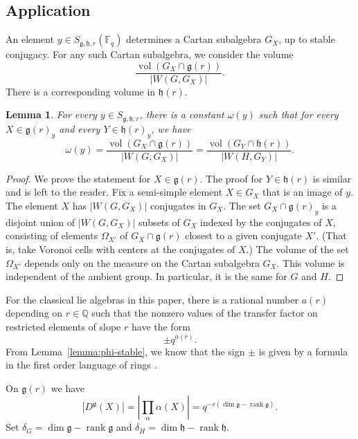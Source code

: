 \documentclass[11pt]{amsart}
\newtheorem{lemma}[theorem]{Lemma}
\theoremstyle{definition}
\theoremstyle{remark}
\numberwithin{equation}{theorem}
\def\f{{\mathbb{F}_q}}
\def\gF{{\mathfrak{g}}}
\def\vol{{\operatorname{vol}}}
\newcommand{\ring}[1]{\mathbb{#1}}
\def\lie#1{{\mathfrak{#1}}}
\def\vol{\operatorname{vol}}
\def\rank{\operatorname{rank}}
\begin{document}
\subsection{Application}


An element $y\in S_{\lie{g},\lie{h},r}(\f)$ determines a Cartan
subalgebra $G_X$, up to stable conjugacy. For any such Cartan
subalgebra, we consider the volume
   \begin{equation}
   \frac{\vol(G_X\cap \lie{g}(r))}{|W(G,G_X)|}.
   \end{equation}
There is a corresponding volume in $\lie{h}(r)$.

\begin{lemma} \label{lemma:weyl}
For every $y\in S_{\lie{g},\lie{h},r}$, there is a constant
$\omega(y)$ such that for every $X\in\lie{g}(r)_y$ and every
$Y\in\lie{h}(r)_y$, we have
   \begin{equation}
   \omega(y) = \frac{\vol(G_X\cap \lie{g}(r))}{|W(G,G_X)|} =
   \frac{\vol(G_Y\cap \lie{h}(r))}{|W(H,G_Y)|}.
   \end{equation}
\end{lemma}

\begin{proof}  We prove the statement for $X\in\lie{g}(r)$.  The
proof for $Y\in\lie{h}(r)$ is similar and is left to the reader.
Fix a semi-simple element $X\in G_X$ that is an image of $y$. The
element $X$ has $|W(G,G_X)|$ conjugates in $G_X$. The set
$G_X\cap\lie{g}(r)_y$ is a disjoint union of $|W(G,G_X)|$ subsets
of $G_X$ indexed by the conjugates of $X$, consisting of elements
$\Omega_{X'}$ of $G_X\cap \lie{g}(r)$ closest to a given conjugate
$X'$. (That is, take Voronoi cells with centers at the conjugates
of $X$.) The volume of the set $\Omega_{X'}$ depends only on the
measure on the Cartan subalgebra $G_X$.  This volume is
independent of the ambient group. In particular, it is the same
for $G$ and $H$.
\end{proof}

For the classical lie algebras in this paper, there is a rational
number $a(r)$ depending on $r\in\ring{Q}$ such that the nonzero
values of the transfer factor on restricted  elements of slope $r$
have the form
   \begin{equation}
   \pm q^{a(r)}.
   \end{equation}
From Lemma~\ref{lemma:phi-stable}, we know that the sign $\pm$ is
given by a formula in the first order language of rings
\cite{VTF}.

On $\lie{g}(r)$ we have
    \begin{equation}\label{eqn:Dg}
    |D^{\gF}(X)| = |\prod_\alpha \alpha(X)| =
    q^{-r (\dim\lie{g}-\rank\lie{g})}.
    \end{equation}
Set $\delta_G = \dim\lie{g}-\rank\lie{g}$ and
   $\delta_H = \dim\lie{h}-\rank\lie{h}$.
\end{document}
